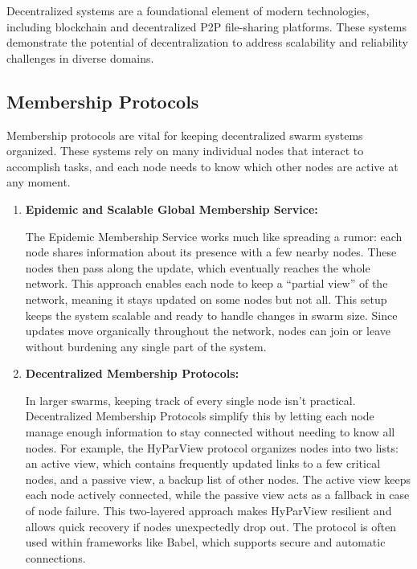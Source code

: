 Decentralized systems are a foundational element of modern technologies, including blockchain and decentralized \gls{P2P} file-sharing platforms. These systems demonstrate the potential of decentralization to address scalability and reliability challenges in diverse domains.

\subsection{Membership Protocols}
\label{sub:membership_protocols}

Membership protocols are vital for keeping decentralized swarm systems organized. These systems rely on many individual nodes that interact to accomplish tasks, and each node needs to know which other nodes are active at any moment. 

\begin{enumerate}
  \item \textbf{Epidemic and Scalable Global Membership Service:}
  
  The Epidemic Membership Service works much like spreading a rumor: each node shares information about its presence with a few nearby nodes. These nodes then pass along the update, which eventually reaches the whole network. This approach enables each node to keep a “partial view” of the network, meaning it stays updated on some nodes but not all. This setup keeps the system scalable and ready to handle changes in swarm size. Since updates move organically throughout the network, nodes can join or leave without burdening any single part of the system.
  
  
  \item \textbf{Decentralized Membership Protocols:}
  
  In larger swarms, keeping track of every single node isn’t practical. Decentralized Membership Protocols simplify this by letting each node manage enough information to stay connected without needing to know all nodes. For example, the HyParView protocol organizes nodes into two lists: an active view, which contains frequently updated links to a few critical nodes, and a passive view, a backup list of other nodes. The active view keeps each node actively connected, while the passive view acts as a fallback in case of node failure. This two-layered approach makes HyParView resilient and allows quick recovery if nodes unexpectedly drop out. The protocol is often used within frameworks like Babel, which supports secure and automatic connections. 
     

\end{enumerate}


